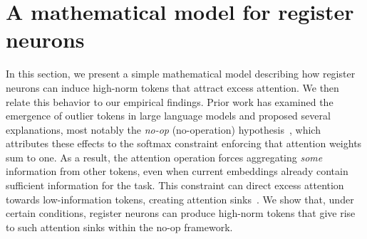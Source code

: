 \documentclass{article}
\begin{document}
\section{A mathematical model for register neurons}
\label{sec:theory}
In this section, we present a simple mathematical model describing how register neurons can induce high-norm tokens that attract excess attention. We then relate this behavior to our empirical findings. Prior work has examined the emergence of outlier tokens in large language models and proposed several explanations, most notably the \textit{no-op} (no-operation) hypothesis~\citep{clark2019does, kobayashiattention, bondarenko2023quantizable}, which attributes these effects to the softmax constraint enforcing that attention weights sum to one. As a result, the attention operation forces aggregating \textit{some} information from other tokens, even when current embeddings already contain sufficient information for the task. This constraint can direct excess attention towards low-information tokens, creating attention sinks~\citep{xiaoefficient}. We show that, under certain conditions, register neurons can produce high-norm tokens that give rise to such attention sinks within the no-op framework.

\end{document}
